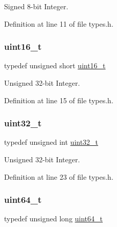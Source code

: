 Signed 8-\/bit Integer. 



Definition at line 11 of file types.\+h.

\mbox{\label{a00023_a273cf69d639a59973b6019625df33e30_a273cf69d639a59973b6019625df33e30}} 
\subsubsection{\texorpdfstring{uint16\+\_\+t}{uint16\_t}}
{\footnotesize\ttfamily typedef unsigned short \hyperlink{a00023_a273cf69d639a59973b6019625df33e30_a273cf69d639a59973b6019625df33e30}{uint16\+\_\+t}}



Unsigned 32-\/bit Integer. 



Definition at line 15 of file types.\+h.

\mbox{\label{a00023_a435d1572bf3f880d55459d9805097f62_a435d1572bf3f880d55459d9805097f62}} 
\subsubsection{\texorpdfstring{uint32\+\_\+t}{uint32\_t}}
{\footnotesize\ttfamily typedef unsigned int \hyperlink{a00023_a435d1572bf3f880d55459d9805097f62_a435d1572bf3f880d55459d9805097f62}{uint32\+\_\+t}}



Unsigned 32-\/bit Integer. 



Definition at line 23 of file types.\+h.

\mbox{\label{a00023_aa232ecf786a74ce5363c36c10798d2b1_aa232ecf786a74ce5363c36c10798d2b1}} 
\subsubsection{\texorpdfstring{uint64\+\_\+t}{uint64\_t}}
{\footnotesize\ttfamily typedef unsigned long \hyperlink{a00023_aa232ecf786a74ce5363c36c10798d2b1_aa232ecf786a74ce5363c36c10798d2b1}{uint64\+\_\+t}}



